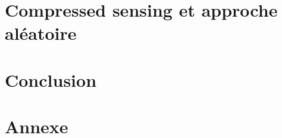 \documentclass[12pt]{report}
\theoremstyle{plain}
\theoremstyle{remark}
\theoremstyle{definition}
\begin{document}
\chapter{Compressed sensing et approche aléatoire}


\chapter{Conclusion}



%

\appendix

\chapter{Annexe}


\printbibliography
\end{document}
